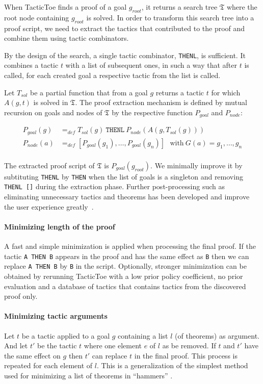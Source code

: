 \documentclass[runningheads,a4paper,draft]{svjour3}
\def\tactictoe{\textsf{TacticToe}\xspace}
\begin{document}
When \tactictoe finds a proof of a goal $g_{root}$, it returns a search tree
$\mathfrak{T}$ where the root node containing $g_{root}$ is solved.
In order to transform this search tree into a proof script, we need to extract
the tactics that contributed to the proof and combine them using tactic
combinators.

By the design of the search, a single tactic combinator, \texttt{THENL}, is
sufficient. It combines a tactic $t$ with a list of subsequent ones, in such a
way that after $t$ is called, for each created goal a respective
tactic from the list is called.

Let $T_{sol}$ be a partial function that from a goal $g$ returns a tactic $t$
for which $A(g,t)$ is solved in $\mathfrak{T}$.
The proof extraction mechanism is defined by mutual
recursion on goals and nodes of $\mathfrak{T}$ by the respective function
$P_{goal}$ and $P_{node}$:

\begin{align*}
P_{goal}(g) &=_{def} T_{sol}(g)\ \texttt{THENL}\ P_{node}(A(g,T_{sol}(g)))\\
P_{node}(a) &=_{def} [P_{goal}(g_1),\ldots,P_{goal}(g_n)]\ \ \ \text{with}\
G(a) = g_1,\ldots,g_n\\
\end{align*}

The extracted proof script of $\mathfrak{T}$ is $P_{goal}(g_{root})$.
We minimally improve it by subtituting \texttt{THENL} by \texttt{THEN} when the
list of goals is a singleton and removing \texttt{THENL []} during the
extraction phase.
Further post-processing such as
eliminating unnecessary tactics and theorems has been developed and
improve the user experience greatly~\cite{DBLP:conf/sefm/Adams15}.

\paragraph{Minimizing length of the proof}
A fast and simple minimization is applied when processing the final proof. If
the tactic \texttt{A THEN B} appears in the proof and has the same effect as
\texttt{B} then we can replace \texttt{A THEN B} by \texttt{B} in the script.
Optionally, stronger minimization can be obtained
by rerunning \tactictoe with a low prior
policy coefficient, no prior evaluation and a database of tactics that contains
tactics from the discovered proof only.

\paragraph{Minimizing tactic arguments}
Let $t$ be a tactic applied to a goal $g$ containing a list $l$ (of theorems)
as argument. And let $t'$ be the tactic $t$ where one element $e$ of $l$ as be
removed. If $t$ and $t'$ have the same effect on $g$ then $t'$ can replace $t$
in the final proof. This process is repeated for each element of $l$.
This is a generalization of the simplest method used for minimizing a list of
theorems in ``hammers'' \cite{hammers4qed}.
\end{document}
